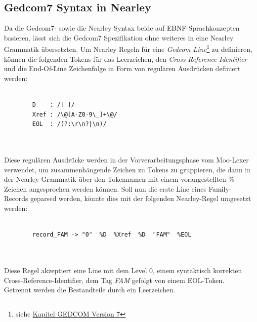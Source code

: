 \subsection{Gedcom7 Syntax in Nearley}
\label{subsec: Implementierung - Gedcom Grammatik - Gedcom7 Syntax in Nearley}
Da die Gedcom7- sowie die Nearley Syntax beide auf EBNF-Sprachkonzepten basieren, lässt sich die Gedcom7 Spezifikation ohne weiteres in eine Nearley Grammatik übersetzten. Um Nearley Regeln für eine \textit{Gedcom Line}\footnote{siehe \hyperref[sec: GEDCOM Version 7]{Kapitel GEDCOM Version 7}} zu definieren, können die folgenden Tokens für das Leerzeichen, den \textit{Cross-Reference Identifier} und die End-Of-Line Zeichenfolge in Form von regulären Ausdrücken definiert werden:
\\ \\
\begin{minipage}{1.0\textwidth} \small
	\begin{lstlisting}
		D    : /[ ]/
		Xref : /\@[A-Z0-9\_]+\@/	
		EOL  : /(?:\r\n?|\n)/
	\end{lstlisting}
	\label{lst: tokens gedcom line}
\end{minipage}
\\ \\
Diese regulären Ausdrücke werden in der Vorverarbeitungsphase vom Moo-Lexer verwendet, um zusammenhängende Zeichen zu Tokens zu gruppieren, die dann in der Nearley Grammatik über den Tokennamen mit einem vorangestellten \%-Zeichen angesprochen werden können. Soll nun die erste Line eines Family-Records geparsed werden, könnte dies mit der folgenden Nearley-Regel umgesetzt werden:
\\ \\
\begin{minipage}{1.0\textwidth} \small
	\begin{lstlisting}
		record_FAM -> "0"  %D  %Xref  %D  "FAM"  %EOL 
	\end{lstlisting}
	\label{lst: nearley regel family record first line}
\end{minipage}
\\ \\
Diese Regel akzeptiert eine Line mit dem Level 0, einem syntaktisch korrekten Cross-Reference-Identifier, dem Tag \textit{FAM} gefolgt von einem EOL-Token. Getrennt werden die Bestandteile durch ein Leerzeichen. 


